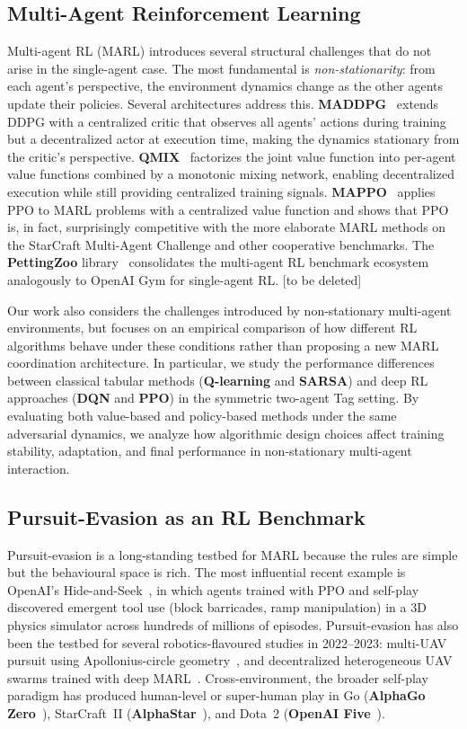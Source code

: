 \documentclass[conference]{IEEEtran}
\begin{document}
\subsection{Multi-Agent Reinforcement Learning}

Multi-agent RL (MARL) introduces several structural challenges that do
not arise in the single-agent case. The most fundamental is
\emph{non-stationarity}: from each agent's perspective, the
environment dynamics change as the other agents update their policies.
Several architectures address this. \textbf{MADDPG}~\cite{lowe2017}
extends DDPG with a centralized critic that observes all agents'
actions during training but a decentralized actor at execution time,
making the dynamics stationary from the critic's perspective.
\textbf{QMIX}~\cite{rashid2018} factorizes the joint value function
into per-agent value functions combined by a monotonic mixing network,
enabling decentralized execution while still providing centralized
training signals. \textbf{MAPPO}~\cite{yu2022} applies PPO to MARL
problems with a centralized value function and shows that PPO is, in
fact, surprisingly competitive with the more elaborate MARL methods on
the StarCraft Multi-Agent Challenge and other cooperative benchmarks.
The \textbf{PettingZoo} library~\cite{terry2021} consolidates the
multi-agent RL benchmark ecosystem analogously to OpenAI Gym for
single-agent RL. [to be deleted]

Our work also considers the challenges introduced by non-stationary
multi-agent environments, but focuses on an empirical comparison of how
different RL algorithms behave under these conditions rather than
proposing a new MARL coordination architecture. In particular, we study
the performance differences between classical tabular methods
(\textbf{Q-learning} and \textbf{SARSA}) and deep RL approaches
(\textbf{DQN} and \textbf{PPO}) in the symmetric two-agent Tag setting.
By evaluating both value-based and policy-based methods under the same
adversarial dynamics, we analyze how algorithmic design choices affect
training stability, adaptation, and final performance in non-stationary
multi-agent interaction.

\subsection{Pursuit-Evasion as an RL Benchmark}

Pursuit-evasion is a long-standing testbed for MARL because the rules
are simple but the behavioural space is rich. The most influential
recent example is OpenAI's Hide-and-Seek~\cite{baker2020}, in which
agents trained with PPO and self-play discovered emergent tool use
(block barricades, ramp manipulation) in a 3D physics simulator across
hundreds of millions of episodes. Pursuit-evasion has also been the
testbed for several robotics-flavoured studies in 2022--2023:
multi-UAV pursuit using Apollonius-circle geometry~\cite{liang2023},
and decentralized heterogeneous UAV swarms trained with
deep MARL~\cite{kouzeghar2023}. Cross-environment, the broader
self-play paradigm has produced human-level or super-human play in
Go (\textbf{AlphaGo Zero}~\cite{silver2017}), StarCraft~II
(\textbf{AlphaStar}~\cite{vinyals2019}), and Dota~2
(\textbf{OpenAI Five}~\cite{berner2019}).
\end{document}
